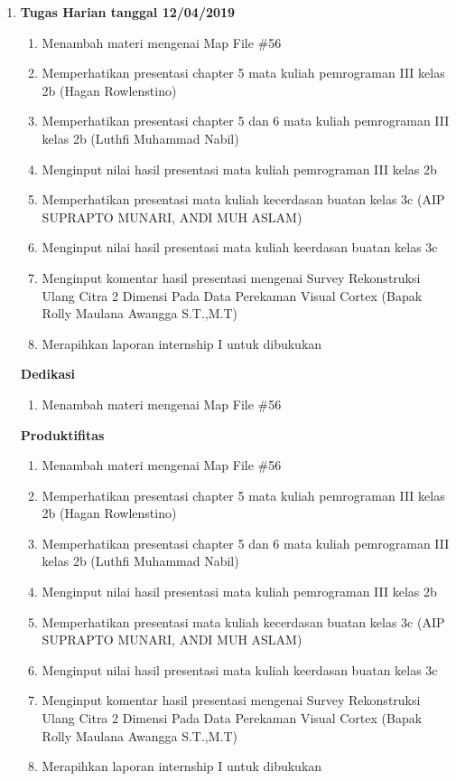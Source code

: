 \begin{enumerate}
\item \textbf{Tugas Harian tanggal 12/04/2019}
\begin{enumerate}
\item Menambah materi mengenai Map File \#56
\item Memperhatikan presentasi chapter 5 mata kuliah pemrograman III kelas 2b (Hagan Rowlenstino)
\item Memperhatikan presentasi chapter 5 dan 6 mata kuliah pemrograman III kelas 2b (Luthfi Muhammad Nabil)
\item Menginput nilai hasil presentasi mata kuliah pemrograman III kelas 2b
\item Memperhatikan presentasi mata kuliah kecerdasan buatan kelas 3c (AIP SUPRAPTO MUNARI, ANDI MUH ASLAM)
\item Menginput nilai hasil presentasi mata kuliah keerdasan buatan kelas 3c
\item Menginput komentar hasil presentasi mengenai Survey Rekonstruksi Ulang Citra 2 Dimensi Pada Data Perekaman Visual Cortex (Bapak Rolly Maulana Awangga S.T.,M.T)
\item Merapihkan laporan internship I untuk dibukukan
\end{enumerate}

\textbf{Dedikasi}
\begin{enumerate}
\item Menambah materi mengenai Map File \#56
\end{enumerate}

\textbf{Produktifitas}
\begin{enumerate}
\item Menambah materi mengenai Map File \#56
\item Memperhatikan presentasi chapter 5 mata kuliah pemrograman III kelas 2b (Hagan Rowlenstino)
\item Memperhatikan presentasi chapter 5 dan 6 mata kuliah pemrograman III kelas 2b (Luthfi Muhammad Nabil)
\item Menginput nilai hasil presentasi mata kuliah pemrograman III kelas 2b
\item Memperhatikan presentasi mata kuliah kecerdasan buatan kelas 3c (AIP SUPRAPTO MUNARI, ANDI MUH ASLAM)
\item Menginput nilai hasil presentasi mata kuliah keerdasan buatan kelas 3c
\item Menginput komentar hasil presentasi mengenai Survey Rekonstruksi Ulang Citra 2 Dimensi Pada Data Perekaman Visual Cortex (Bapak Rolly Maulana Awangga S.T.,M.T)
\item Merapihkan laporan internship I untuk dibukukan
\end{enumerate}


\end{enumerate}

